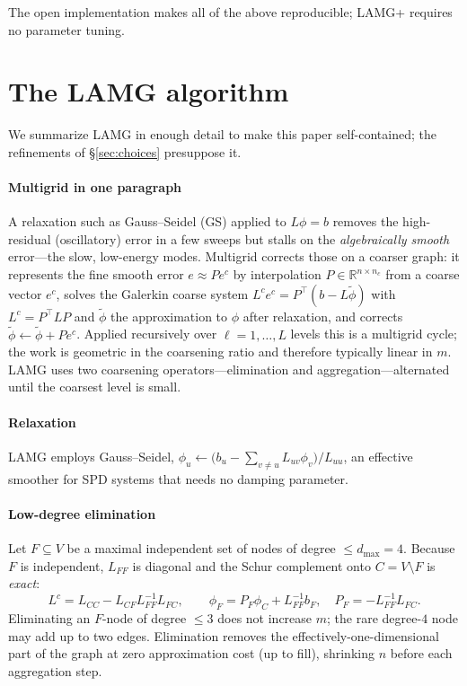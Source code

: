 \documentclass[review]{siamart220329}
\newcommand{\R}{\mathbb{R}}
\begin{document}
The open implementation makes all of the above reproducible; LAMG+ requires no parameter tuning.

\section{The LAMG algorithm}\label{sec:alg}
We summarize LAMG \cite{lamg} in enough detail to make this paper self-contained; the
refinements of \S\ref{sec:choices} presuppose it.

\paragraph{Multigrid in one paragraph} A relaxation such as Gauss--Seidel (GS) applied to
$L\phi=b$ removes the high-residual (oscillatory) error in a few sweeps but stalls on the
\emph{algebraically smooth} error---the slow, low-energy modes. Multigrid corrects those
on a coarser graph: it represents the fine smooth error $e\approx Pe^c$ by interpolation
$P\in\R^{n\times n_c}$ from a coarse vector $e^c$, solves the Galerkin coarse system
$L^c e^c=P^{\top}(b-L\tilde\phi)$ with $L^c=P^{\top}LP$ and $\tilde\phi$ the approximation to $\phi$ after relaxation, and corrects
$\tilde\phi\leftarrow\tilde\phi+Pe^c$. Applied recursively over $\ell=1,\dots,L$ levels
this is a multigrid cycle; the work is geometric in the coarsening ratio and therefore typically linear in $m$.
LAMG uses two coarsening operators---elimination and aggregation---alternated until the
coarsest level is small.

\paragraph{Relaxation} LAMG employs Gauss--Seidel,
$\phi_u\leftarrow\big(b_u-\sum_{v\neq u}L_{uv}\phi_v\big)/L_{uu}$, an effective smoother
for SPD systems that needs no damping parameter.

\paragraph{Low-degree elimination} Let $F\subseteq V$ be a maximal independent set of
nodes of degree $\le d_{\max}=4$. Because $F$ is independent, $L_{FF}$ is diagonal and the
Schur complement onto $C=V\setminus F$ is \emph{exact}:
\begin{equation}\label{eq:elim}
L^c=L_{CC}-L_{CF}L_{FF}^{-1}L_{FC},\qquad
\phi_F=P_F\phi_C+L_{FF}^{-1}b_F,\quad P_F=-L_{FF}^{-1}L_{FC}.
\end{equation}
Eliminating an $F$-node of degree $\le 3$ does not increase $m$; the rare degree-$4$ node
may add up to two edges. Elimination removes the effectively-one-dimensional part of the graph at
zero approximation cost (up to fill), shrinking $n$ before each aggregation step.
\end{document}
